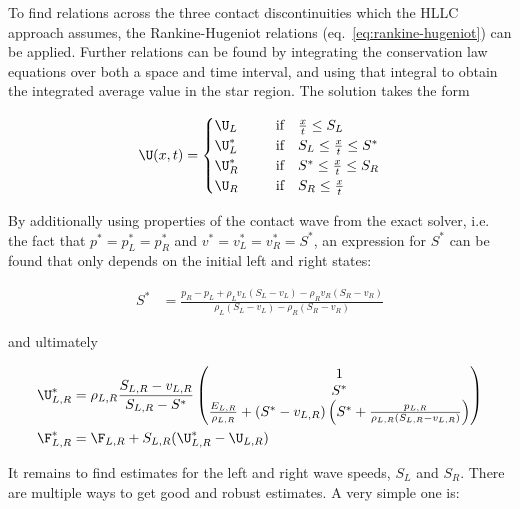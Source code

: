 
To find relations across the three contact discontinuities which the HLLC approach assumes, the
Rankine-Hugeniot relations (eq.~\ref{eq:rankine-hugeniot}) can be applied. Further relations can be
found by integrating the conservation law equations over both a space and time interval, and using
that integral to obtain the integrated average value in the star region. The solution takes the form

\begin{align}
	\U(x, t) = \begin{cases}
		\U_L ~~~~ &\text{ if }		~~	\frac{x}{t} \leq S_L \\
		\U^*_L ~~~~ &\text{ if }	~~  S_L \leq \frac{x}{t} \leq S^* \\
		\U^*_R ~~~~ &\text{ if }	~~	S^* \leq \frac{x}{t} \leq S_R \\
		\U_R ~~~~ &\text{ if }		~~	S_R \leq \frac{x}{t} \\
	\end{cases}
\end{align}

By additionally using properties of the contact wave from the exact solver, i.e. the fact that $p^*
= p^*_L = p^*_R$ and $v^* = v^*_L = v^*_R = S^*$, an expression for $S^*$ can be found that only
depends on the initial left and right states:

\begin{align}
	S^* &=
		\frac{p_R - p_L  + \rho_L v_L (S_L - v_L) - \rho_R v_R (S_R - v_R)}
			{\rho_L (S_L - v_L) - \rho_R (S_R - v_R) } \label{eq:hllc-sstar}
\end{align}

and ultimately

\begin{align}
	\U^*_{L,R} &=
		\rho_{L,R} \frac{ S_{L,R} - v_{L,R}}{S_{L,R} - S^*}
		\begin{pmatrix}
			1\\
			S^*\\
			\frac{E_{L,R}}{\rho_{L,R}} + (S^* - v_{L,R}) \left( S^* +
\frac{p_{L,R}}{\rho_{L,R}(S_{L,R} - v_{L,R})} \right)
		\end{pmatrix} \\
	\F^*_{L,R} &=
		\F_{L, R} + S_{L,R} ( \U^*_{L,R} - \U_{L,R} )
\end{align}

It remains to find estimates for the left and right wave speeds, $S_L$ and $S_R$.
There are multiple ways to get good and robust estimates. A very simple one is:

